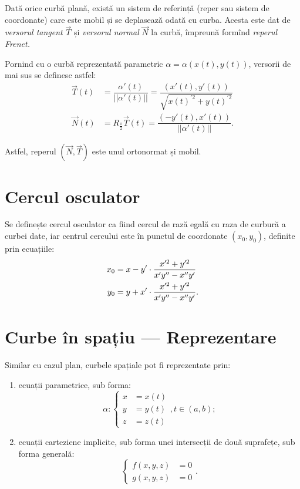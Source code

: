 Dată orice curbă plană, există un sistem de referință (reper sau sistem de
coordonate) care este mobil și se deplasează odată cu curba. Acesta este
dat de \emph{versorul tangent} $\vec{T} $ și \emph{versorul normal} $ \vec{N} $
la curbă, împreună formînd \emph{reperul Frenet.}

Pornind cu o curbă reprezentată parametric $ \alpha = \alpha(x(t), y(t)) $,
versorii de mai sus se definesc astfel:
\begin{align*}
  \vec{T}(t) &= \dfrac{\alpha'(t)}{||\alpha'(t)||} = %
  \dfrac{(x'(t), y'(t))}{\sqrt{x(t)^{\prime 2} + y(t)^{\prime 2}}} \\
  \vec{N}(t) &= R_{\frac{\pi}{2}} \vec{T}(t) = %
  \dfrac{(-y'(t), x'(t))}{||\alpha'(t)||}.
\end{align*}

Astfel, reperul $(\vec{N}, \vec{T}) $ este unul ortonormat și mobil.


\section{Cercul osculator}

Se definește cercul osculator ca fiind cercul de rază egală cu raza de
curbură a curbei date, iar centrul cercului este în punctul de coordonate
$ (x_0, y_0) $, definite prin ecuațiile:
\begin{align*}
  x_0 &= x - y' \cdot \dfrac{x^{\prime 2} + y^{\prime 2}}{%
  x'y^{\prime\prime} - x^{\prime\prime}y'} \\
    y_0 &= y + x' \cdot \dfrac{x^{\prime 2} + y^{\prime 2}}{%
    x'y^{\prime\prime} - x^{\prime\prime}y'}.
\end{align*}


\section{Curbe în spațiu --- Reprezentare}


Similar cu cazul plan, curbele spațiale pot fi reprezentate prin:
\begin{enumerate}[(1)]
  \item ecuații parametrice, sub forma:
    \[
      \alpha : \begin{cases}
        x &= x(t) \\
        y &= y(t) \\
        z &= z(t)
      \end{cases}, t \in (a, b);
    \]
  \item ecuații carteziene implicite, sub forma unei intersecții de
    două suprafețe, sub forma generală:
    \[
      \begin{cases}
        f(x, y, z) &= 0 \\
        g(x, y, z) &= 0
      \end{cases}.
    \]
\end{enumerate}


